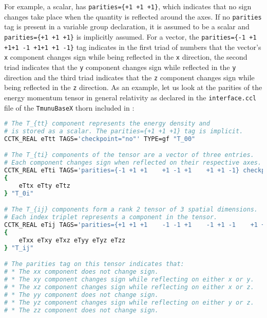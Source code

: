 For example, a scalar, has \texttt{parities=\{+1 +1 +1\}}, which indicates that no sign changes take place when the quantity is reflected around the axes. If no \texttt{parities} tag is present in a variable group declaration, it is assumed to be a scalar and \texttt{parities=\{+1 +1 +1\}} is implicitly assumed. For a vector, the \texttt{parities=\{-1 +1 +1\hspace{15pt}+1 -1 +1\hspace{15pt}+1 +1 -1\}} tag indicates in the first triad of numbers that the vector's \texttt{x} component changes sign while being reflected in the \texttt{x} direction, the second triad indicates that the \texttt{y} component changes sign while reflected in the \texttt{y} direction and the third triad indicates that the \texttt{z} component changes sign while being reflected in the \texttt{z} direction. As an example, let us look at the parities of the energy momentum tensor in general relativity as declared in the \texttt{interface.ccl} file of the \texttt{TmunuBaseX} thorn included in \CarpetX\space: 
%
\begin{lstlisting}[language=bash]
# The T_{tt} component represents the energy density and
# is stored as a scalar. The parities={+1 +1 +1} tag is implicit.
CCTK_REAL eTtt TAGS='checkpoint="no"' TYPE=gf "T_00"

# The T_{ti} components of the tensor are a vector of three entries.
# Each component changes sign when reflected on their respective axes.
CCTK_REAL eTti TAGS='parities={-1 +1 +1    +1 -1 +1    +1 +1 -1} checkpoint="no"' TYPE=gf
{ 
    eTtx eTty eTtz
} "T_0i"

# The T_{ij} components form a rank 2 tensor of 3 spatial dimensions.
# Each index triplet represents a component in the tensor.
CCTK_REAL eTij TAGS='parities={+1 +1 +1    -1 -1 +1    -1 +1 -1    +1 +1 +1    +1 -1 -1    +1 +1 +1} checkpoint="no"' TYPE=gf
{
    eTxx eTxy eTxz eTyy eTyz eTzz
} "T_ij"

# The parities tag on this tensor indicates that:
# * The xx component does not change sign.
# * The xy component changes sign while reflecting on either x or y.
# * The xz component changes sign while reflecting on either x or z.
# * The yy component does not change sign.
# * The yz component changes sign while reflecting on either y or z.
# * The zz component does not change sign.
\end{lstlisting}

